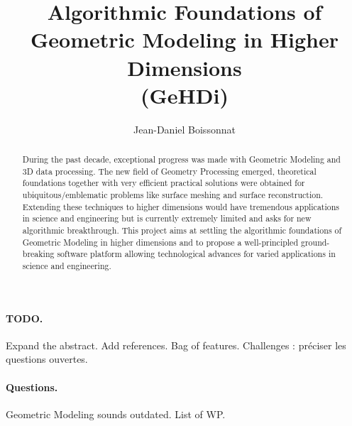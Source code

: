 \documentclass[a4paper, 11pt]{article}
\begin{document}
\title{Algorithmic Foundations of \\%
Geometric Modeling in Higher Dimensions\\ (GeHDi)}
\author{Jean-Daniel Boissonnat}

\maketitle

\begin{abstract}

During the past decade, exceptional progress was made with Geometric Modeling and 3D data processing. The new field of Geometry Processing emerged, theoretical foundations together with very efficient practical solutions were obtained for ubiquitous/emblematic problems like surface meshing and surface reconstruction. Extending these techniques to higher dimensions would have tremendous applications in science and engineering but is currently extremely limited and asks for new algorithmic  breakthrough. This project aims at settling the algorithmic foundations of Geometric Modeling in higher dimensions and to propose a well-principled ground-breaking software platform allowing technological advances for varied applications in science and engineering.

\end{abstract}

\paragraph{TODO.} Expand the abstract. Add references. Bag of features. Challenges : préciser les questions ouvertes.

\paragraph{Questions.} 
Geometric Modeling sounds outdated. List of WP. 
\newpage


\newpage



\newpage


\end{document}
